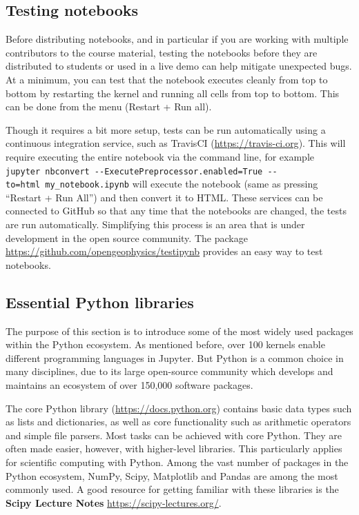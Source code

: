 \documentclass[]{book}
\begin{document}
\hypertarget{testing-notebooks}{%
\subsection{Testing notebooks}\label{testing-notebooks}}

Before distributing notebooks, and in particular if you are working
with multiple contributors to the course material, testing the
notebooks before they are distributed to students or used in a live
demo can help mitigate unexpected bugs. At a minimum, you can test
that the notebook executes cleanly from top to bottom by restarting
the kernel and running all cells from top to bottom. This can be done
from the menu (Restart + Run all).

Though it requires a bit more setup, tests can be run automatically
using a continuous integration service, such as TravisCI
(\url{https://travis-ci.org}). This will require
executing the entire notebook via the command line, for example
\texttt{jupyter\ nbconvert\ -\/-ExecutePreprocessor.enabled=True\ -\/-to=html\ my\_notebook.ipynb} will execute the notebook (same as pressing
``Restart + Run All'') and then convert it to HTML. These services can
be connected to GitHub so that any time that the notebooks are
changed, the tests are run automatically. Simplifying this process is
an area that is under development in the open source community. The
package
\url{https://github.com/opengeophysics/testipynb}
provides an easy way to test notebooks.

\hypertarget{essential-python-libraries}{%
\subsection{Essential Python libraries}\label{essential-python-libraries}}

The purpose of this section is to introduce some of the most widely
used packages within the Python ecosystem. As mentioned before, over 100 kernels enable different programming languages in Jupyter.
But Python is a common choice in many disciplines, due to its
large open-source community which develops and maintains an ecosystem of over 150,000 software packages.

The core Python library
(\href{https://docs.python.org/3/}{https://docs.python.org}) contains basic data
types such as lists and dictionaries, as well as core functionality
such as arithmetic operators and simple file parsers. Most tasks can
be achieved with core Python. They are often made easier, however, with
higher-level libraries. This particularly applies for
scientific computing with Python.
Among the vast number of packages in the Python ecosystem, NumPy,
Scipy, Matplotlib and Pandas are among the most commonly used.
A good resource for getting familiar with these libraries
is the \textbf{Scipy Lecture Notes} \url{https://scipy-lectures.org/}.
\end{document}
